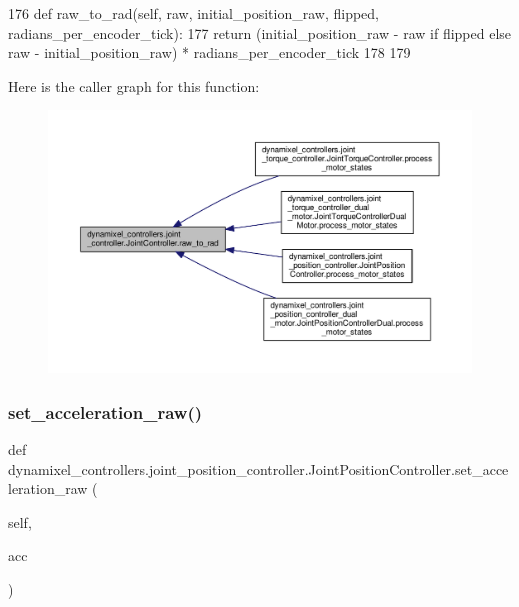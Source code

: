 \begin{DoxyCode}
176     \textcolor{keyword}{def }raw\_to\_rad(self, raw, initial\_position\_raw, flipped, radians\_per\_encoder\_tick):
177         \textcolor{keywordflow}{return} (initial\_position\_raw - raw \textcolor{keywordflow}{if} flipped \textcolor{keywordflow}{else} raw - initial\_position\_raw) * 
      radians\_per\_encoder\_tick
178 
179 \end{DoxyCode}
Here is the caller graph for this function\+:
\nopagebreak
\begin{figure}[H]
\begin{center}
\leavevmode
\includegraphics[width=350pt]{d3/dcd/classdynamixel__controllers_1_1joint__controller_1_1_joint_controller_a58a58e669c2918d00cc358f2b58d061c_icgraph}
\end{center}
\end{figure}
\mbox{\label{classdynamixel__controllers_1_1joint__position__controller_1_1_joint_position_controller_a587671fc4cf186ccc583b5cce53bcb17}} 
\subsubsection{\texorpdfstring{set\+\_\+acceleration\+\_\+raw()}{set\_acceleration\_raw()}}
{\footnotesize\ttfamily def dynamixel\+\_\+controllers.\+joint\+\_\+position\+\_\+controller.\+Joint\+Position\+Controller.\+set\+\_\+acceleration\+\_\+raw (\begin{DoxyParamCaption}\item[{}]{self,  }\item[{}]{acc }\end{DoxyParamCaption})}



